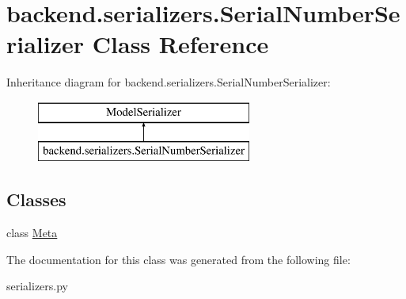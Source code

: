 \hypertarget{classbackend_1_1serializers_1_1_serial_number_serializer}{}\section{backend.\+serializers.\+Serial\+Number\+Serializer Class Reference}
\label{classbackend_1_1serializers_1_1_serial_number_serializer}
Inheritance diagram for backend.\+serializers.\+Serial\+Number\+Serializer\+:\begin{figure}[H]
\begin{center}
\leavevmode
\includegraphics[height=2.000000cm]{classbackend_1_1serializers_1_1_serial_number_serializer}
\end{center}
\end{figure}
\subsection*{Classes}
\begin{DoxyCompactItemize}
\item 
class \hyperlink{classbackend_1_1serializers_1_1_serial_number_serializer_1_1_meta}{Meta}
\end{DoxyCompactItemize}


The documentation for this class was generated from the following file\+:\begin{DoxyCompactItemize}
\item 
serializers.\+py\end{DoxyCompactItemize}
